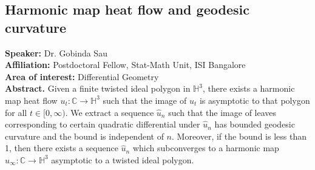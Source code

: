 \subsection*{Harmonic map heat flow and geodesic curvature} %
\noindent
\textbf{Speaker:} Dr. Gobinda Sau \\ %
\textbf{Affiliation:} Postdoctoral Fellow, Stat-Math Unit, ISI Bangalore \\ %
\textbf{Area of interest:} Differential Geometry \\

\noindent\textbf{Abstract.} Given a finite twisted ideal polygon in \(\mathbb{H}^3\), there exists a harmonic
map heat flow \(u_t : \mathbb{C} \to \mathbb{H}^3\) such that the image of \(u_t\) is asymptotic to that
polygon for all \(t \in [0, \infty)\). We extract a sequence \(\hat{u}_n\) such that the image
of leaves corresponding to certain quadratic differential under \(\hat{u}_n\) has bounded
geodesic curvature and the bound is independent of \(n\). Moreover, if the bound
is less than 1, then there exists a sequence \(\hat{u}_n\) which subconverges to a harmonic
map \(\hat{u}_\infty : \mathbb{C} \to \mathbb{H}^3\)  asymptotic to a twisted ideal polygon.

